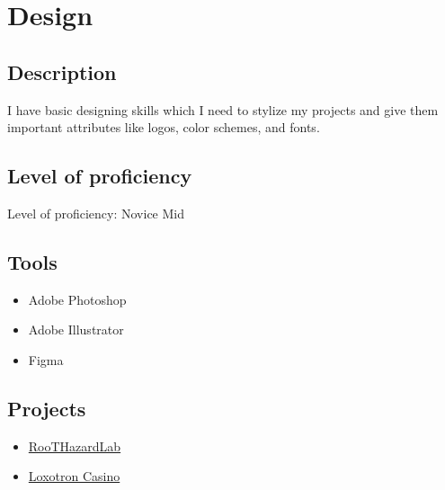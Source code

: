 \section{Design}

\subsection{Description}

I have basic designing skills which I need to stylize my projects
and give them important attributes like logos, color schemes, and fonts.

\subsection{Level of proficiency}

Level of proficiency: Novice Mid

\subsection{Tools}

\begin{itemize}
    \item Adobe Photoshop
    \item Adobe Illustrator
    \item Figma
\end{itemize}

\subsection{Projects}

\begin{itemize}
    \item \hyperlink{proj_rhl}{RooTHazardLab}
    \item \hyperlink{proj_loxotron}{Loxotron Casino}
\end{itemize}

\newpage

